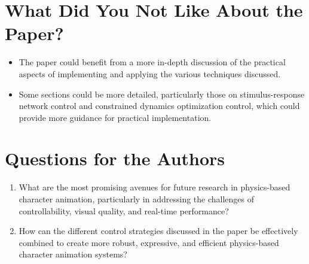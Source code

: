 \documentclass[12pt]{article}
\begin{document}
\section{What Did You Not Like About the Paper?}
\begin{itemize}[noitemsep]
    \item The paper could benefit from a more in-depth discussion of the practical aspects of implementing and applying the various techniques discussed.
    \item Some sections could be more detailed, particularly those on stimulus-response network control and constrained dynamics optimization control, which could provide more guidance for practical implementation.
\end{itemize}

\section{Questions for the Authors}
\begin{enumerate}[noitemsep]
    \item What are the most promising avenues for future research in physics-based character animation, particularly in addressing the challenges of controllability, visual quality, and real-time performance?
    \item How can the different control strategies discussed in the paper be effectively combined to create more robust, expressive, and efficient physics-based character animation systems?
\end{enumerate}
\end{document}
